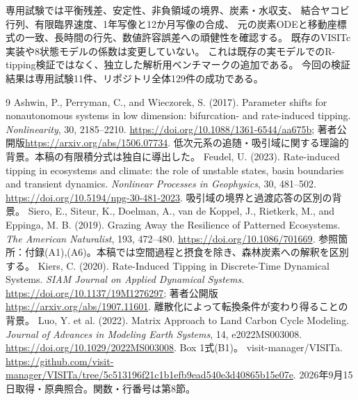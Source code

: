 \documentclass[a4paper,11pt]{ltjsarticle}
\begin{document}
専用試験では平衡残差、安定性、非負領域の境界、炭素・水収支、
結合ヤコビ行列、有限臨界速度、1年写像と12か月写像の合成、
元の炭素ODEと移動座標式の一致、長時間の行先、数値許容誤差への頑健性を確認する。
既存のVISITc実装や8状態モデルの係数は変更していない。
これは既存の実モデルでのR-tipping検証ではなく、独立した解析用ベンチマークの追加である。
今回の検証結果は専用試験11件、リポジトリ全体129件の成功である。

\begin{thebibliography}{9}
 Ashwin, P., Perryman, C., and Wieczorek, S. (2017).
Parameter shifts for nonautonomous systems in low dimension: bifurcation- and rate-induced tipping.
\textit{Nonlinearity}, 30, 2185--2210.
\url{https://doi.org/10.1088/1361-6544/aa675b};
著者公開版\url{https://arxiv.org/abs/1506.07734}.
低次元系の追随・吸引域に関する理論的背景。本稿の有限積分式は独自に導出した。
 Feudel, U. (2023).
Rate-induced tipping in ecosystems and climate: the role of unstable states, basin boundaries and transient dynamics.
\textit{Nonlinear Processes in Geophysics}, 30, 481--502.
\url{https://doi.org/10.5194/npg-30-481-2023}.
吸引域の境界と過渡応答の区別の背景。
 Siero, E., Siteur, K., Doelman, A., van de Koppel, J., Rietkerk, M., and Eppinga, M. B. (2019).
Grazing Away the Resilience of Patterned Ecosystems.
\textit{The American Naturalist}, 193, 472--480.
\url{https://doi.org/10.1086/701669}.
参照箇所：付録(A1),(A6)。本稿では空間過程と摂食を除き、森林炭素への解釈を区別する。
 Kiers, C. (2020).
Rate-Induced Tipping in Discrete-Time Dynamical Systems.
\textit{SIAM Journal on Applied Dynamical Systems}.
\url{https://doi.org/10.1137/19M1276297};
著者公開版\url{https://arxiv.org/abs/1907.11601}.
離散化によって転換条件が変わり得ることの背景。
 Luo, Y. et al. (2022).
Matrix Approach to Land Carbon Cycle Modeling.
\textit{Journal of Advances in Modeling Earth Systems}, 14, e2022MS003008.
\url{https://doi.org/10.1029/2022MS003008}. Box 1式(B1)。
 visit-manager/VISITa.
\url{https://github.com/visit-manager/VISITa/tree/5c513196f21c1b1efb9ead540e3d40865b15e07e}.
2026年9月15日取得・原典照合。関数・行番号は第8節。
\end{thebibliography}
\end{document}
